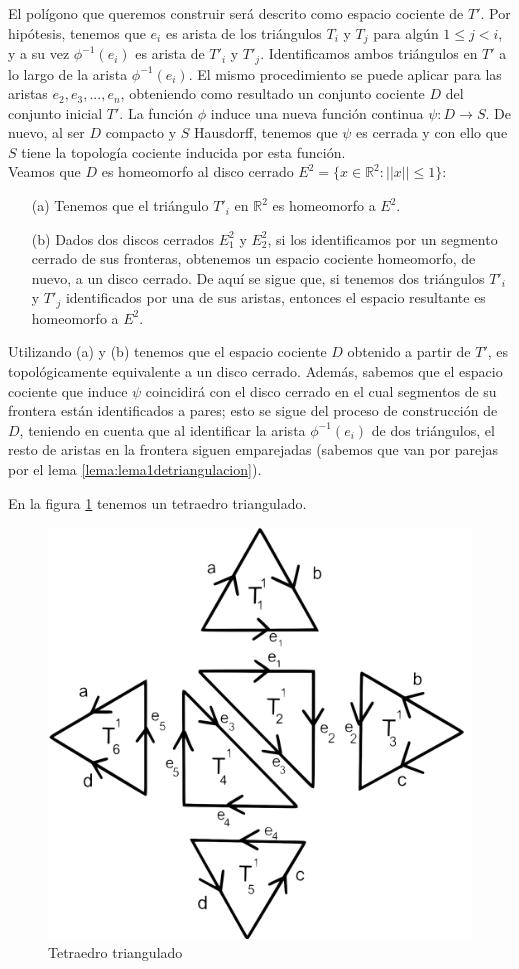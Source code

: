 \documentclass[a4paper,11pt,spanish, twoside, leqno]{tfg-uam}
\newcommand*{\reales}{\mathbb{R}}
\theoremstyle{definition}
\begin{document}
El polígono que queremos construir será descrito como espacio cociente de $T'$. Por hipótesis, tenemos que $e_i$ es arista de los triángulos $T_i$ y $T_j$ para algún $1\leq j < i$, y a su vez $\phi^{-1}(e_i)$ es arista de $T'_i$ y $T'_j$. Identificamos ambos triángulos en $T'$ a lo largo de la arista $\phi^{-1}(e_i)$. El mismo procedimiento se puede aplicar para las aristas $e_2, e_3, ..., e_n$, obteniendo como resultado un conjunto cociente $D$ del conjunto inicial $T'$. La función $\phi$ induce una nueva función continua $\psi: D \longrightarrow S$. De nuevo, al ser $D$ compacto y $S$ Hausdorff, tenemos que $\psi$ es   cerrada y con ello que $S$ tiene la topología cociente inducida por esta función. \\
Veamos que $D$ es homeomorfo al disco cerrado $E^2 = \{x\in \reales^2: ||x||\leq 1\}$:

\begin{enumerate}
\item[(a)] Tenemos que el triángulo $T'_i$ en $\reales^2$ es homeomorfo a $E^2$.

\item[(b)] Dados dos discos cerrados $E^2_1$ y $E^2_2$, si los identificamos por un segmento cerrado de sus fronteras, obtenemos un espacio cociente homeomorfo, de nuevo, a un disco cerrado. De aquí se sigue que, si tenemos dos triángulos $T'_i$ y $T'_j$  identificados por una de sus aristas, entonces el espacio resultante es homeomorfo a $E^2$.
\end{enumerate}
Utilizando (a) y (b) tenemos que el espacio cociente $D$ obtenido a partir de $T'$, es topológicamente equivalente a un disco cerrado. Además, sabemos que el espacio cociente que induce $\psi$ coincidirá  con el disco cerrado en el cual segmentos de su frontera están identificados a pares; esto se sigue del proceso de construcción de $D$, teniendo en cuenta que al identificar la arista $\phi^{-1}(e_i)$ de dos triángulos, el resto de aristas en la frontera siguen emparejadas (sabemos que van por parejas por el lema \ref{lema:lema1detriangulacion}).


En la figura \ref{fig:tetraedrotriangulado} tenemos un tetraedro triangulado.

\begin{figure}[h!]
	\centering
	\includegraphics[width=0.3\linewidth]{imagenes/tetraedro.png}
	\caption{Tetraedro triangulado}
	\label{fig:tetraedrotriangulado}
\end{figure}
\end{document}
